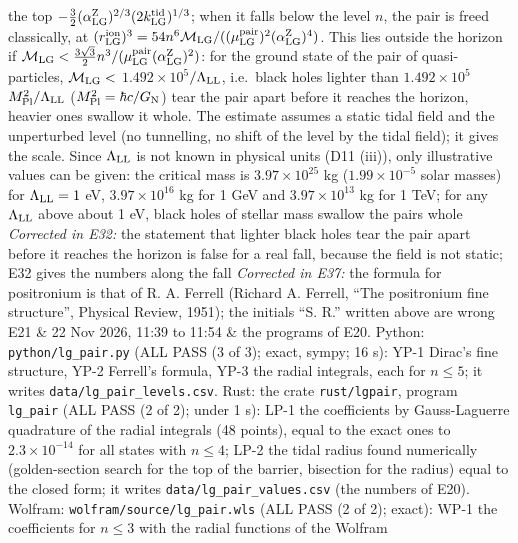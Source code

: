 \documentclass[
  10pt,
]{article}
\begin{document}
\begin{longtable}[]
the top
\(-\tfrac32(\alpha^{\rm Z}_{\rm LG})^{2/3}(2k^{\rm tid}_{\rm LG})^{1/3}\);
when it falls below the level \(n\), the pair is freed classically, at
\((r^{\rm ion}_{\rm LG})^3=54n^6\mathcal M_{\rm LG}/((\mu^{\rm pair}_{\rm LG})^2(\alpha^{\rm Z}_{\rm LG})^4)\).
This lies outside the horizon if
\(\mathcal M_{\rm LG}<\tfrac{3\sqrt3}2n^3/(\mu^{\rm pair}_{\rm LG}(\alpha^{\rm Z}_{\rm LG})^2)\):
for the ground state of the pair of quasi-particles,
\(\mathcal M_{\rm LG}<\) \(1.492\times10^{5}\)\(/\Lambda_{\rm LL}\),
i.e.~black holes lighter than \(1.492\times10^{5}\)
\(M_{\rm Pl}^2/\Lambda_{\rm LL}\) (\(M^2_{\rm Pl}=\hbar c/G_{\rm N}\))
tear the pair apart before it reaches the horizon, heavier ones swallow
it whole. The estimate assumes a static tidal field and the unperturbed
level (no tunnelling, no shift of the level by the tidal field); it
gives the scale. Since \(\Lambda_{\rm LL}\) is not known in physical
units (D11 (iii)), only illustrative values can be given: the critical
mass is \(3.97\times10^{25}\) kg (\(1.99\times10^{-5}\) solar masses)
for \(\Lambda_{\rm LL}=1\) eV, \(3.97\times10^{16}\) kg for 1 GeV and
\(3.97\times10^{13}\) kg for 1 TeV; for any \(\Lambda_{\rm LL}\) above
about 1 eV, black holes of stellar mass swallow the pairs whole
\emph{Corrected in E32:} the statement that lighter black holes tear the
pair apart before it reaches the horizon is false for a real fall,
because the field is not static; E32 gives the numbers along the fall
\emph{Corrected in E37:} the formula for positronium is that of R. A.
Ferrell (Richard A. Ferrell, ``The positronium fine structure'',
Physical Review, 1951); the initials ``S. R.'' written above are
wrong \\
E21 & 22 Nov 2026, 11:39 to 11:54 & the programs of E20. Python:
\texttt{python/lg\_pair.py} (ALL PASS (3 of 3); exact, sympy; 16 s):
YP-1 Dirac's fine structure, YP-2 Ferrell's formula, YP-3 the radial
integrals, each for \(n\le5\); it writes
\texttt{data/lg\_pair\_levels.csv}. Rust: the crate
\texttt{rust/lgpair}, program \texttt{lg\_pair} (ALL PASS (2 of 2);
under 1 s): LP-1 the coefficients by Gauss-Laguerre quadrature of the
radial integrals (48 points), equal to the exact ones to
\(2.3\times10^{-14}\) for all states with \(n\le4\); LP-2 the tidal
radius found numerically (golden-section search for the top of the
barrier, bisection for the radius) equal to the closed form; it writes
\texttt{data/lg\_pair\_values.csv} (the numbers of E20). Wolfram:
\texttt{wolfram/source/lg\_pair.wls} (ALL PASS (2 of 2); exact): WP-1
the coefficients for \(n\le3\) with the radial functions of the Wolfram

\end{longtable}
\end{document}

